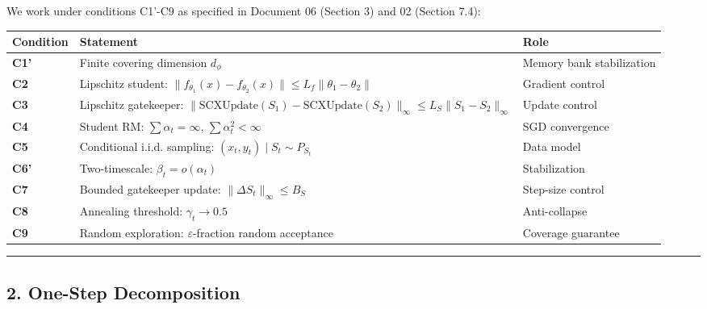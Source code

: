 \documentclass[
  12pt,
]{ctexart}
\begin{document}
We work under conditions C1'-C9 as specified in Document 06 (Section 3)
and 02 (Section 7.4):

\begin{longtable}[]{@{}
  >{\raggedright\arraybackslash}p{}
  >{\raggedright\arraybackslash}p{}
  >{\raggedright\arraybackslash}p{}@{}}
\toprule\noalign{}
\begin{minipage}[b]{\linewidth}\raggedright
Condition
\end{minipage} & \begin{minipage}[b]{\linewidth}\raggedright
Statement
\end{minipage} & \begin{minipage}[b]{\linewidth}\raggedright
Role
\end{minipage} \\
\midrule\noalign{}
\endhead
\bottomrule\noalign{}
\endlastfoot
\textbf{C1'} & Finite covering dimension \(d_\phi\) & Memory bank
stabilization \\
\textbf{C2} & Lipschitz student:
\(\|f_{\theta_1}(x) - f_{\theta_2}(x)\| \leq L_f \|\theta_1 - \theta_2\|\)
& Gradient control \\
\textbf{C3} & Lipschitz gatekeeper:
\(\|\text{SCXUpdate}(S_1) - \text{SCXUpdate}(S_2)\|_\infty \leq L_S \|S_1 - S_2\|_\infty\)
& Update control \\
\textbf{C4} & Student RM: \(\sum \alpha_t = \infty\),
\(\sum \alpha_t^2 < \infty\) & SGD convergence \\
\textbf{C5} & Conditional i.i.d. sampling:
\((x_t, y_t) \mid S_t \sim P_{S_t}\) & Data model \\
\textbf{C6'} & Two-timescale: \(\beta_t = o(\alpha_t)\) &
Stabilization \\
\textbf{C7} & Bounded gatekeeper update:
\(\|\Delta S_t\|_\infty \leq B_S\) & Step-size control \\
\textbf{C8} & Annealing threshold: \(\gamma_t \to 0.5\) &
Anti-collapse \\
\textbf{C9} & Random exploration: \(\varepsilon\)-fraction random
acceptance & Coverage guarantee \\
\end{longtable}

\begin{center}\rule{0.5\linewidth}{0.5pt}\end{center}

\subsection{2. One-Step Decomposition}\label{one-step-decomposition}
\end{document}
